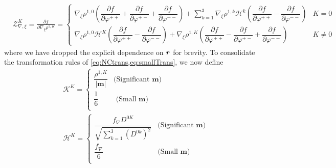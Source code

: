 \begin{subequations}
\label{eq:ZvarphiVar}
\begin{align}
&\mathcal{Z}^K_{\nabla,\xi} = \frac{\partial f}{\partial \nabla_\xi \rho^{1,K}} = \begin{cases}
                                                          \nabla_\xi\rho^{1,0}    \left(  \dfrac{\partial f}{\partial \varphi^{++}} + \dfrac{\partial f}{\partial \varphi^{+-}} + \dfrac{\partial f}{\partial \varphi^{--}} \right)  
                                                          + \sum_{k=1}^3 \nabla_\xi \rho^{1,k} \mathscr H^k 
                                                          \left( \dfrac{\partial f}{\partial \varphi^{++}} - \dfrac{\partial f}{\partial \varphi^{--}} 
                                                          \right)                                                          
                                                          & K= 0 \\[8pt]                                                                                                        
                                                          \nabla_\xi\rho^{1,0} \mathscr H^K  \left( \dfrac{\partial f}{\partial \varphi^{++}} - \dfrac{\partial f}{\partial \varphi^{--}} \right) 
                                                          + \nabla_\xi\rho^{1,K}
                                                          \left(\dfrac{\partial f}{\partial \varphi^{++}} - \dfrac{\partial f}{\partial \varphi^{+-}} + \dfrac{\partial f}{\partial \varphi^{--}}
                                                           \right)
                                                          & K \neq 0
                                                        \end{cases}                                                                                                                                     
\end{align}
\end{subequations}
where we have dropped the explicit dependence on $\boldsymbol{r}$ for brevity. To consolidate the transformation rules of 
\cref{eq:NCtrans,eq:smallTrans}, we now define
\begin{subequations}
\begin{align}
&\mathscr K^K = 
\begin{cases}
  \dfrac{\rho^{1,K}}{\vert \mathbf{m} \vert} & \text{(Significant }\mathbf{m}\text{)} \\[20pt]
  \dfrac{1}{6} & \text{ (Small }\mathbf{m}\text{)} \\[12pt]
\end{cases}\\
&\mathscr H^K = 
\begin{cases}
  \dfrac{f_\nabla D^{0K} }{\sqrt{\sum_{k=1}^3 \left(D^{0k}\right)^2   }} & \text{(Significant }\mathbf{m}\text{)} \\[20pt]
  \dfrac{f_\nabla}{6} & \text{(Small }\mathbf{m}\text{)} \\[12pt]
\end{cases}
\end{align}
\end{subequations}


